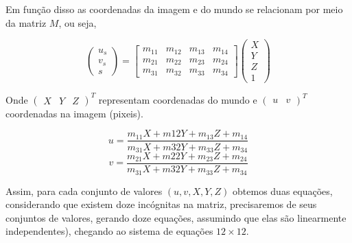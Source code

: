 \documentclass[ecp,tc]{iiufrgs}
\begin{document}
Em função disso as coordenadas da imagem e do mundo se relacionam por meio da matriz $ M $, ou seja,

\[
\begin{pmatrix} u_s \\ v_s \\ s \end{pmatrix} = \begin{bmatrix} m_{11} & m_{12} & m_{13} & m_{14} \\ m_{21} & m_{22} & m_{23} & m_{24} \\ m_{31} & m_{32} & m_{33} & m_{34} \end{bmatrix} \begin{pmatrix} X \\ Y \\ Z \\ 1 \end{pmatrix}
\]

Onde $ \begin{pmatrix} X & Y & Z \end{pmatrix}^T $ representam coordenadas do mundo e $ \begin{pmatrix} u & v \end{pmatrix}^T $ coordenadas na imagem (pixeis).

\[
u = \dfrac{m_{11}X + m{12}Y + m_{13}Z + m_{14}}{m_{31}X + m{32}Y + m_{33}Z + m_{34}}
\]
\[
v = \dfrac{m_{21}X + m{22}Y + m_{23}Z + m_{24}}{m_{31}X + m{32}Y + m_{33}Z + m_{34}}
\]

Assim, para cada conjunto de valores $ (u, v, X, Y, Z) $ obtemos duas equações, considerando que existem doze incógnitas na matriz, precisaremos de seus conjuntos de valores, gerando doze equações, assumindo que elas são linearmente independentes),
chegando ao sistema de equações $ 12\times12 $.

\setcounter{MaxMatrixCols}{20}
\end{document}
